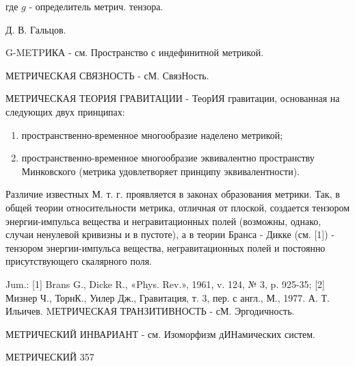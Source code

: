 \documentclass[10pt]{article}
\begin{document}
где $g$ - определитель метрич. тензора.



Д. В. Гальцов.



G-METPИКА - см. Пространство с индефинитной метрикой.



МЕТРИЧЕСКАЯ СВЯЗНОСТЬ - сМ. СвязНость.



МЕТРИЧЕСКАЯ ТЕОРИЯ ГРАВИТАЦИИ - ТеорИЯ гравитации, основанная на следующих двух принципах:



\begin{enumerate}

  \item пространственно-временное многообразие наделено метрикой;



  \item пространственно-временное многообразие эквивалентно пространству Минковского (метрика удовлетворяет принципу эквивалентности).



\end{enumerate}



Различие известных М. т. г. проявляется в законах образования метрики. Так, в общей теории относительности метрика, отличная от плоской, создается тензором энергии-импульса вещества и негравитационных полей (возможны, однако, случаи ненулевой кривизны и в пустоте), а в теории Бранса - Дикке (см. [1]) - тензором энергии-импульса вещества, негравитационных полей и постоянно присутствующего скалярного поля.



Jum.: [1] Brans G., Dicke R., «Phys. Rev.», 1961, v. 124, № 3, p. 925-35; [2] Мизнер Ч., ТорнК., Уилер Дж., Гравитация, т. 3, пер. с англ., М., 1977. А. Т. Ильичев. MЕТРИЧЕСКАЯ ТРАНЗИТИВНОСТЬ - сМ. Эргодичность.



МЕТРИЧЕСКИЙ ИНВАРИАНТ - см. Изоморфизм дИНамических систем.



МЕТРИЧЕСКИЙ 357
\end{document}
